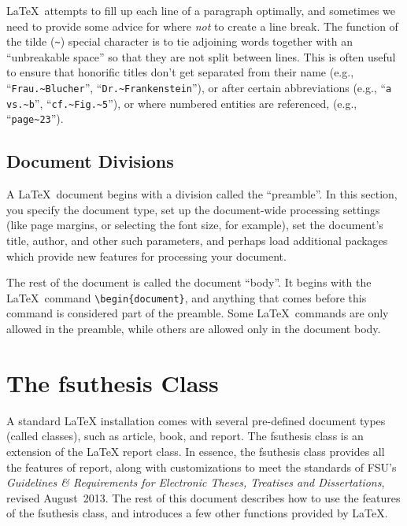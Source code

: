 \documentclass[11pt,letterpaper]{ltxdockit}[2011/03/25]
\newcommand*{\booktitle}[1]{\textit{#1}}
\newcommand*{\pkg}[1]{\textsf{#1}}
\newcommand*{\fsuth}{\pkg{fsuthesis}}
\renewcommand{\-}{\discretionary{}{}{}}
\begin{document}
\LaTeX\ attempts to fill up each line of a paragraph optimally, and
sometimes we need to provide some advice for where \emph{not} to
create a line break.  The function of the tilde (\verb|~|) special
character is to tie adjoining words together with an ``unbreakable
space'' so that they
are not split between lines.  This is often useful to ensure that
honorific titles don't get separated from their name (e.g.,
``\verb|Frau.~Blucher|'', ``\verb|Dr.~Frankenstein|''), or after
certain abbreviations (e.g., ``\verb|a vs.~b|'',
``\verb|cf.~Fig.~5|''), or where numbered entities are referenced,
(e.g., ``\verb|page~23|'').

\subsection{Document Divisions} 
A \LaTeX\ document begins with a division called the
``preamble''.  In this section, you specify the
document type, set up the document-wide processing settings (like page
margins, or selecting the font size, for example), set the document's
title, author, and other such parameters, and perhaps load additional
packages which provide new features for processing your document.

The rest of the document is called the document ``body''.  It begins
with the \LaTeX\ command
\verb|\begin{document}|,
and anything that comes before this command is considered part of the
preamble. Some \LaTeX\ commands are only allowed in the preamble,
while others are allowed only in the document body.

\section{The \fsuth{} Class}
\label{sec:class}

A standard \LaTeX{} installation comes with several pre-defined
document types (called classes), such as \pkg{article},
\pkg{book}, and \pkg{report}.  The \fsuth{} class is an
extension of the \LaTeX{} \pkg{report} class.  In essence, the
\fsuth{} class provides all the features of \pkg{report}, along
with customizations to meet the standards of FSU's
\booktitle{Guidelines \& Requirements for Electronic Theses, Treatises
  and Dissertations}, revised August~2013.  The rest of this
document describes how to use the features of the \fsuth{} class, and
introduces a few other functions provided by \LaTeX.
\end{document}
